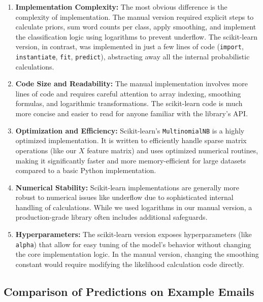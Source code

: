 \documentclass[12pt,letterpaper]{article}
\begin{document}
\begin{enumerate}
    \item \textbf{Implementation Complexity:} The most obvious difference is the complexity of implementation. The manual version required explicit steps to calculate priors, sum word counts per class, apply smoothing, and implement the classification logic using logarithms to prevent underflow. The scikit-learn version, in contrast, was implemented in just a few lines of code (\texttt{import}, \texttt{instantiate}, \texttt{fit}, \texttt{predict}), abstracting away all the internal probabilistic calculations.
    
    \item \textbf{Code Size and Readability:} The manual implementation involves more lines of code and requires careful attention to array indexing, smoothing formulas, and logarithmic transformations. The scikit-learn code is much more concise and easier to read for anyone familiar with the library's API.
    
    \item \textbf{Optimization and Efficiency:} Scikit-learn's \texttt{MultinomialNB} is a highly optimized implementation. It is written to efficiently handle sparse matrix operations (like our $X$ feature matrix) and uses optimized numerical routines, making it significantly faster and more memory-efficient for large datasets compared to a basic Python implementation.
    
    \item \textbf{Numerical Stability:} Scikit-learn implementations are generally more robust to numerical issues like underflow due to sophisticated internal handling of calculations. While we used logarithms in our manual version, a production-grade library often includes additional safeguards.
    
    \item \textbf{Hyperparameters:} The scikit-learn version exposes hyperparameters (like \texttt{alpha}) that allow for easy tuning of the model's behavior without changing the core implementation logic. In the manual version, changing the smoothing constant would require modifying the likelihood calculation code directly.
\end{enumerate}

\subsection{Comparison of Predictions on Example Emails}
\end{document}
